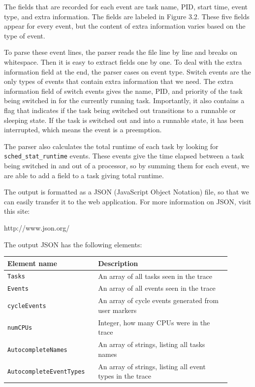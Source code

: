 \documentclass{hmcclinic}
\begin{document}
  The fields that are recorded for each event are task name, PID, start time, 
  event type, and extra information. The fields are labeled in Figure 3.2. 
These five fields appear for every event, but the content of extra information
  varies based on the type of event.

  To parse these event lines, the parser reads the file line by line and breaks on
  whitespace. Then it is easy to extract fields one by one. To deal with the
  extra information field at the end, the parser cases on event type. Switch events
  are the only types of events that contain extra information that we need.  The
  extra information field of switch events gives the name, PID, and priority of
  the task being switched in for the currently running task. Importantly, it
  also contains a flag that indicates if the task being switched out transitions
  to a runnable or sleeping state. If the task is switched out and into a
  runnable state, it has been interrupted,  which means the event is a preemption.

  The parser also calculates the total runtime of each task by looking for
\texttt{sched\_stat\_runtime} events. These events give the time elapsed between
  a task being switched in and out of a processor, so by summing them for 
  each event, we are able to add a field to a task giving total runtime.

  The output is formatted as a JSON (JavaScript Object Notation) file, so that we can easily transfer it to
  the web application. For more information on JSON, visit this site:

\begin{center}
http://www.json.org/
\end{center}

The output JSON has the following elements:

  \begin{center}
    \begin{tabular}{p{0.35\linewidth}p{0.55\linewidth}}
      \toprule
      Element name        & Description\\
      \midrule
      \texttt{Tasks}      & An array of all tasks seen in the trace\\
       \texttt{Events}     & An array of all events seen in the trace\\
       \texttt{cycleEvents} & An array of cycle events generated from user markers\\
       \texttt{numCPUs}     & Integer, how many CPUs were in the trace\\
       \texttt{AutocompleteNames} & An array of strings, listing all tasks names\\
       \texttt{AutocompleteEventTypes} & An array of strings, listing all event types in the trace\\
      \bottomrule
    \end{tabular}
  \end{center}
\end{document}
